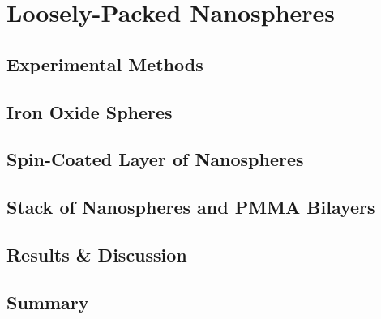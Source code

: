 \documentclass[\main/dresen_thesis.tex]{subfiles}
\renewcommand{\thisPath}{\main/chapters/looselyPackedNS}
\begin{document}
  \chapter{Loosely-Packed Nanospheres}\label{ch:looselyPackedNS}
    
      \FloatBarrier
      \clearpage

    \section{Experimental Methods}
      
        \FloatBarrier
        \clearpage

    \section{Iron Oxide Spheres}\label{sec:looselyPackedNP:sphericalIronOxideNP}
      
        \FloatBarrier
        \clearpage

    \section{Spin-Coated Layer of Nanospheres}
      
      \FloatBarrier
        \clearpage

    \section{Stack of Nanospheres and PMMA Bilayers}
      \FloatBarrier
        \clearpage

    \section{Results \& Discussion}
      \FloatBarrier
        \clearpage

    \section{Summary}
      
      \FloatBarrier
\end{document}
